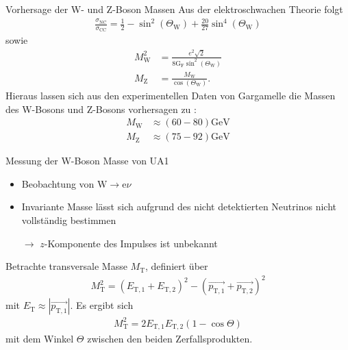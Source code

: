 \documentclass[aspectratio=1610, professionalfonts, 10pt]{beamer}
\begin{document}

\begin{frame}{Vorhersage der W- und Z-Boson Massen}
			Aus der elektroschwachen Theorie folgt \cite{vorhersage}
			\begin{align*}
				\frac{\sigma_\text{NC}}{\sigma_\text{CC}} = \frac{1}{2} - \sin^2{\left( \Theta_\text{W}\right)} + \frac{20}{27} \sin^4{\left( \Theta_\text{W}\right)}
			\end{align*}
			sowie
			\begin{align*}
				M_\text{W}^2 &= \frac{e^2 \sqrt{2}}{8 \text{G}_\text{F} \sin^2{\left( \Theta_\text{W}\right)} }\\
				M_\text{Z} &= \frac{M_\text{W}}{\cos{\left( \Theta_\text{W}  \right)}}.
			\end{align*}
			Hieraus lassen sich aus den experimentellen Daten von Gargamelle die Massen des W-Bosons und Z-Bosons vorhersagen zu
			\cite{doi:10.1142/9789814644150_0006}:
			\begin{align*}
				M_\text{W} &\approx \left(60-80\right)\si{\giga\electronvolt}\\
				M_\text{Z} &\approx \left(75-92\right)\si{\giga\electronvolt}
			\end{align*}
\end{frame}

\begin{frame}{Messung der W-Boson Masse von UA1}
				\begin{itemize}
					\setlength\itemsep{0.5em}
					\vspace*{-20px}
					\item Beobachtung von $\text{W} \rightarrow \text{e} \nu$
					\item Invariante Masse lässt sich aufgrund des nicht detektierten Neutrinos nicht vollständig bestimmen
					\item[$\rightarrow$] $z$-Komponente des Impulses ist unbekannt
				\end{itemize}
				Betrachte transversale Masse $M_\text{T}$, definiert über
				\begin{align*}
					M_\text{T}^2 = \left( E_{\text{T}, 1} + E_{\text{T}, 2} \right)^2 - \left( \vec{p_{\text{T}, 1}} + \vec{p_{\text{T}, 2}} \right)^2
				\end{align*}
				mit $E_\text{T} \approx |\vec{p_{\text{T}, 1}}|$. Es ergibt sich
				\begin{align*}
					M_\text{T}^2 = 2 E_{\text{T}, 1} E_{\text{T}, 2} \left( 1 - \cos{\Theta} \right)
				\end{align*}
				mit dem Winkel $\Theta$ zwischen den beiden Zerfallsprodukten.
\end{frame}
\end{document}
